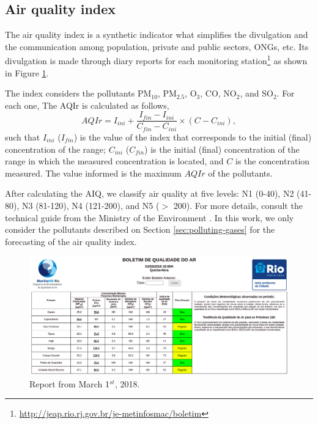 \subsection{Air quality index}

The air quality index is a synthetic indicator what simplifies the divulgation
and the communication among population, private and public sectors, ONGs, etc.
Its divulgation is made through diary reports for each monitoring
station\footnote{\url{http://jeap.rio.rj.gov.br/je-metinfosmac/boletim}} as
shown in Figure \ref{fig:boletim}. 

The index considers the pollutants PM$_{10}$, PM$_{2.5}$, O$_3$,
CO, NO$_2$, and SO$_2$. For each one, The AQIr is calculated as follows,
\begin{equation}
    \label{eq:AQI}
    AQIr = I_{ini} + \frac{I_{fin} - I_{ini}}{C_{fin} - C_{ini}} \times (C - C_{ini}), 
\end{equation}
such that $I_{ini}$ ($I_{fin}$) is the value of the index that corresponds to
the initial (final) concentration of the range; $C_{ini}$ ($C_{fin}$) is the
initial (final) concentration of the range in which the measured concentration
is located, and $C$ is the concentration measured. The value informed is the
maximum $AQIr$ of the pollutants. 

After calculating the AIQ, we classify air quality at five levels: N1 (0-40),
N2 (41-80), N3 (81-120), N4 (121-200), and N5 ($>$ 200). For more details,
consult the technical guide from the Ministry of the Environment
\cite{guia-tecnico-mma}. In this work, we only consider the pollutants
described on Section \ref{sec:polluting-gases} for the forecasting of the air
quality index. 

\begin{figure}[!ht]  
    \includegraphics[width=\linewidth]{../images/boletim01-03-2018.png}
    \caption{Report from March 1$^{st}$, 2018.}
    \label{fig:boletim}
\end{figure}



